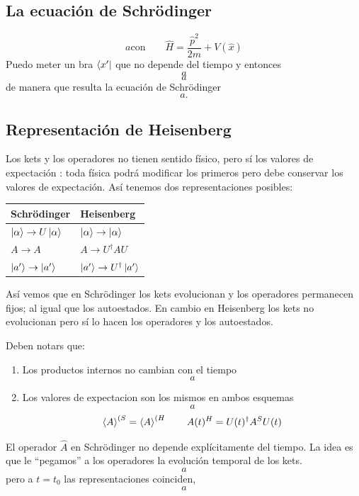 \documentclass[10pt,oneside]{CBFT_book}
\begin{document}
\subsection{La ecuación de Schrödinger}

\[
	a \text{con} \qquad \hat{H} = \frac{\hat{p}^2}{2m} + V(\hat{x}) 
\]
Puedo meter un bra $\Bra{x'}$ que no depende del tiempo y entonces 
\[
	a
\]
\[
	a
\]
de manera que resulta la ecuación de Schrödinger
\[
	a .
\]

\subsection{Representación de Heisenberg}

Los kets y los operadores no tienen sentido físico, pero sí los valores de expectación : toda física podrá modificar 
los primeros pero debe conservar los valores de expectación. Así tenemos dos representaciones posibles:

\begin{center}
\begin{tabular}{|l|l|}
\hline
Schrödinger & Heisenberg \\
\hline
$\Ket{\alpha} \to U\Ket{\alpha}$ & $\Ket{\alpha} \to \Ket{\alpha}$ \\
$A \to A $ & $A \to U^\dagger AU $ \\
$\Ket{a'} \to \Ket{a'}$ & $\Ket{a'} \to U^\dagger \Ket{a'}$ \\
\hline
\end{tabular}
\end{center}
Así vemos que en Schrödinger los kets evolucionan y los operadores permanecen fijos; al igual que los autoestados.
En cambio en Heisenberg los kets no evolucionan pero sí lo hacen los operadores y los autoestados.

Deben notars que:
\begin{enumerate}
 \item Los productos internos no cambian con el tiempo
 \[
	a
 \]
 \item Los valores de expectacion son los mismos en ambos esquemas
 \[
	a
 \]
 \[
	\Braket{A}^{(S} = \Braket{A}^{(H} \qquad A(t)^H = U(t)^\dagger A^S U(t)
 \]
\end{enumerate}

El operador $\hat{A}$ en Schrödinger no depende explícitamente del tiempo. La idea es que le ``pegamos'' a los 
operadores la evolución temporal de los kets.
\[
	a
\]
pero a $t=t_0$ las representaciones coinciden,
\[
	a
\]
\end{document}
